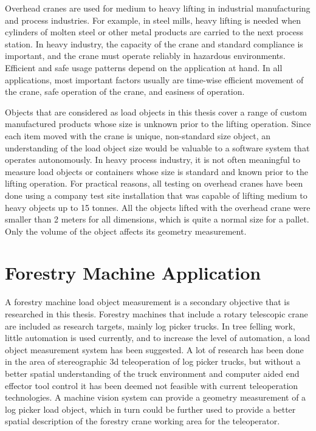 \documentclass[12pt,a4paper,oneside,pdftex]{report}
\begin{document}
    Overhead cranes are used for medium to heavy lifting in industrial manufacturing and process industries. For example, in steel mills, heavy lifting is needed when cylinders of molten steel or other metal products are carried to the next process station. In heavy industry, the capacity of the crane and standard compliance is important, and the crane must operate reliably in hazardous environments. Efficient and safe usage patterns depend on the application at hand. In all applications, most important factors usually are time-wise efficient movement of the crane, safe operation of the crane, and easiness of operation.\par
    Objects that are considered as load objects in this thesis cover a range of custom manufactured products whose size is unknown prior to the lifting operation. Since each item moved with the crane is unique, non-standard size object, an understanding of the load object size would be valuable to a software system that operates autonomously.
    In heavy process industry, it is not often meaningful to measure load objects or containers whose size is standard and known prior to the lifting operation. For practical reasons, all testing on overhead cranes have been done using a company test site installation that was capable of lifting medium to heavy objects up to 15 tonnes. All the objects lifted with the overhead crane were smaller than 2 meters for all dimensions, which is quite a normal size for a pallet. Only the volume of the object affects its geometry measurement.

\section{Forestry Machine Application}
\label{section:forestry_machine_application}

A forestry machine load object measurement is a secondary objective that is researched in this thesis. Forestry machines that include a rotary telescopic crane are included as research targets, mainly log picker trucks. In tree felling work, little automation is used currently, and to increase the level of automation, a load object measurement system has been suggested. A lot of research has been done in the area of stereographic 3d teleoperation of log picker trucks, but without a better spatial understanding of the truck environment and computer aided end effector tool control it has been deemed not feasible with current teleoperation technologies. A machine vision system can provide a geometry measurement of a log picker load object, which in turn could be further used to provide a better spatial description of the forestry crane working area for the teleoperator. 
\end{document}
